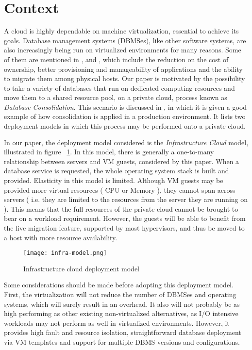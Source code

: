 \section{Context}

A cloud is highly dependable on machine virtualization, essential to achieve its goals. Database management systems (DBMSes), like other software systems, are also increasingly being run on virtualized environments for many reasons. Some of them are mentioned in \cite{4498282}, \cite{4401021} and \cite{Soror:2008:AVM:1376616.1376711}, which include the reduction on the cost of ownership, better provisioning and manageability of applications and the ability to migrate them among physical hosts. Our paper is motivated by the possibility to take a variety of databases that run on dedicated computing resources and move them to a shared resource pool, on a private cloud, process known as \textit{Database Consolidation}. This scenario is discussed in \cite{instance1290}, in which it is given a good example of how consolidation is applied in a production environment. It lists two deployment models in which this process may be performed onto a private cloud. 

In our paper, the deployment model considered is the \textit{Infrastructure Cloud} model, illustrated in figure  ~\ref{fig:infra-model}. In this model, there is generally a one-to-many relationship between servers and VM guests, considered by this paper. When a database service is requested, the whole operating system stack is built and provided. Elasticity in this model is limited. Although VM guests may be provided more virtual resources ( CPU or Memory ), they cannot span across servers ( i.e. they are limited to the resources from the server they are running on ). This means that the full resources of the private cloud cannot be brought to bear on a workload requirement. However, the guests will be able to benefit from the live migration feature, supported by most hypervisors, and thus be moved to a host with more resource availability. 

\begin{figure}[ht]
\centering
\texttt{[image: infra-model.png]}
\caption{Infrastructure cloud deployment model}
\label{fig:infra-model}
\end{figure} 

Some considerations should be made before adopting this deployment model. First, the virtualization will not reduce the number of DBMSes and operating systems, which will surely result in an overhead. It also will not probably be as high performing as other existing non-virtualized alternatives, as I/O intensive workloads may not perform as well in virtualized environments. However, it provides high fault and resource isolation, straightforward database deployment via VM templates and  support for multiple DBMS versions and configurations.


